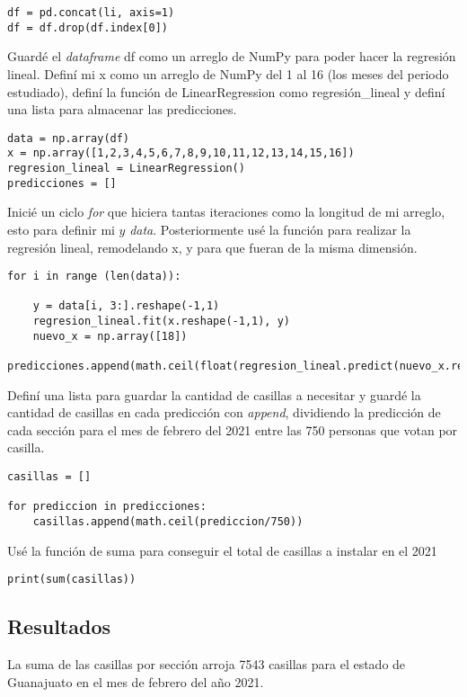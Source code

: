 \documentclass{article}
\begin{document}
\begin{lstlisting}
df = pd.concat(li, axis=1)
df = df.drop(df.index[0])
\end{lstlisting}

Guardé el \textit{dataframe} df como un arreglo de NumPy para poder hacer la regresión lineal. Definí mi x como un arreglo de NumPy del 1 al 16 (los meses del periodo estudiado), definí la función de LinearRegression como regresión\_lineal y definí una lista para almacenar las predicciones.

\begin{lstlisting}
data = np.array(df)
x = np.array([1,2,3,4,5,6,7,8,9,10,11,12,13,14,15,16])
regresion_lineal = LinearRegression()
predicciones = []
\end{lstlisting}

Inicié un ciclo \textit{for} que hiciera tantas iteraciones como la longitud de mi arreglo, esto para definir mi $y$ \textit{data}. Posteriormente usé la función para realizar la regresión lineal, remodelando x, y para que fueran de la misma dimensión.

\begin{lstlisting}
for i in range (len(data)):

    y = data[i, 3:].reshape(-1,1)
    regresion_lineal.fit(x.reshape(-1,1), y) 
    nuevo_x = np.array([18]) 
    predicciones.append(math.ceil(float(regresion_lineal.predict(nuevo_x.reshape(-1,1)))))
 \end{lstlisting}
 
 Definí una lista para guardar la cantidad de casillas a necesitar y guardé la cantidad de casillas en cada predicción con \textit{append}, dividiendo la predicción de cada sección para el mes de febrero del 2021 entre las 750 personas que votan por casilla.
 
 \begin{lstlisting}
casillas = []

for prediccion in predicciones:
    casillas.append(math.ceil(prediccion/750))
\end{lstlisting}
Usé la función de suma para conseguir el total de casillas a instalar en el 2021
\begin{lstlisting}
print(sum(casillas))
\end{lstlisting}

\subsection{Resultados}\label{res_1}
La suma de las casillas por sección arroja 7543 casillas para el estado de Guanajuato en el mes de febrero del año 2021.
\end{document}
